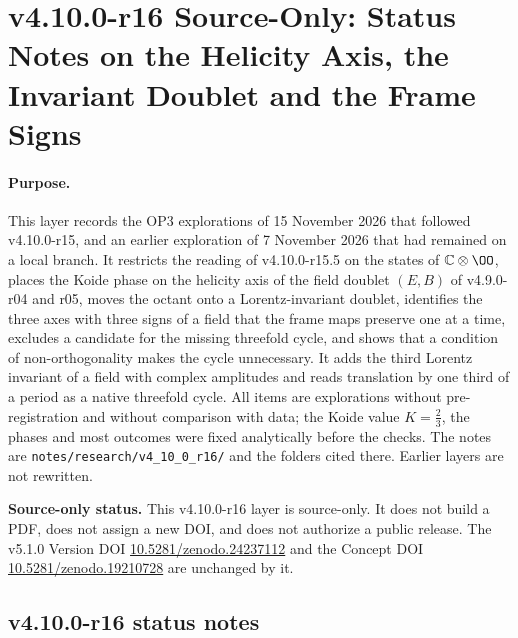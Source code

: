 
\clearpage
\section*{v4.10.0-r16 Source-Only: Status Notes on the Helicity Axis, the Invariant Doublet and the Frame Signs}
\label{sec:v4100-r16-helicity-invariant-doublet}

\paragraph{Purpose.}
This layer records the OP3 explorations of 15 November 2026 that followed v4.10.0-r15, and an earlier exploration of
7 November 2026 that had remained on a local branch.  It restricts the reading of v4.10.0-r15.5 on the states of
\(\mathbb C\otimes\OO\), places the Koide phase on the helicity axis of the field doublet \((E,B)\) of v4.9.0-r04 and r05, moves
the octant onto a Lorentz-invariant doublet, identifies the three axes with three signs of a field that the frame maps
preserve one at a time, excludes a candidate for the missing threefold cycle, and shows that a condition of
non-orthogonality makes the cycle unnecessary.  It adds the third Lorentz invariant of a field with complex amplitudes and
reads translation by one third of a period as a native threefold cycle.  All items are explorations without
pre-registration and without comparison with data; the Koide value \(K=\tfrac23\), the phases and most outcomes were fixed
analytically before the checks.  The notes are \texttt{notes/\allowbreak research/\allowbreak v4\_10\_0\_r16/} and the
folders cited there.  Earlier layers are not rewritten.

\noindent\textbf{Source-only status.}
This v4.10.0-r16 layer is source-only.  It does not build a PDF, does not assign a new DOI,
and does not authorize a public release.  The v5.1.0 Version DOI
\href{https://doi.org/10.5281/zenodo.24237112}{10.5281/zenodo.24237112} and the Concept DOI
\href{https://doi.org/10.5281/zenodo.19210728}{10.5281/zenodo.19210728} are unchanged by it.

\subsection*{v4.10.0-r16 status notes}
\label{subsec:v4100-r16-status}

